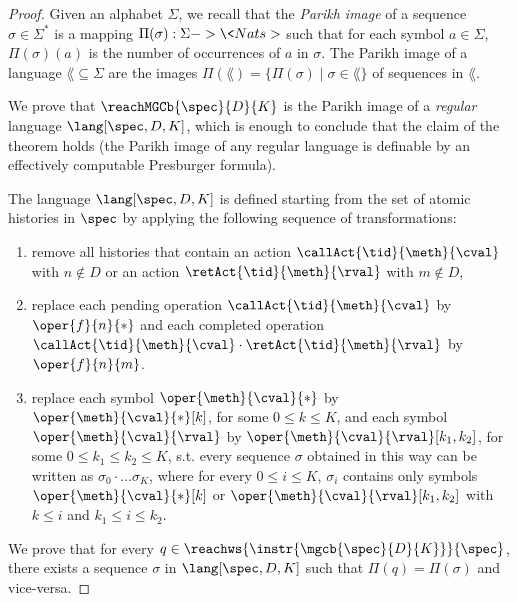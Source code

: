 \begin{proof}
Given an alphabet $\Sigma$, we recall that the \emph{Parikh image} of a sequence $\sigma\in\Sigma^*$ is a mapping 
$\Pi(\sigma):\Sigma->\<Nats>$ such that for each symbol $a\in\Sigma$, $\Pi(\sigma)(a)$ is the number of occurrences of $a$ in $\sigma$.
The Parikh image of a language $\lang\subseteq\Sigma$ are the images $\Pi(\lang)=\{\Pi(\sigma)\mid \sigma\in \lang\}$
of sequences in $\lang$. 

We prove that $\reachMGCb{\spec}{D}{K}$ is the Parikh image of a \emph{regular} language $\lang[\spec,D,K]$, which is enough to
conclude that the claim of the theorem holds (the Parikh image of any regular language is definable by an effectively computable Presburger formula). 

The language $\lang[\spec,D,K]$ is defined starting from the set of atomic histories in $\spec$ by applying the following sequence of transformations: %
\begin{enumerate}
	\item remove all histories that contain an action $\callAct{\tid}{\meth}{\cval}$ with $n\not\in D$ or an action $\retAct{\tid}{\meth}{\rval}$ with 
$m\not\in D$,
	\item replace each pending operation $\callAct{\tid}{\meth}{\cval}$ by $\oper{f}{n}{*}$ and each completed
operation $\callAct{\tid}{\meth}{\cval}\cdot \retAct{\tid}{\meth}{\rval}$ by $\oper{f}{n}{m}$.
	\item replace each symbol $\oper{\meth}{\cval}{*}$ by $\oper{\meth}{\cval}{*}[k]$, for some $0\leq k\leq K$, and each symbol 
$\oper{\meth}{\cval}{\rval}$ by $\oper{\meth}{\cval}{\rval}[k_1,k_2]$, for some $0\leq k_1\leq k_2\leq K$, s.t. every sequence $\sigma$ obtained in this way can be written as $\sigma_0\cdot\ldots\sigma_K$,
where for every $0\leq i\leq K$, $\sigma_i$ contains only symbols $\oper{\meth}{\cval}{*}[k]$ or $\oper{\meth}{\cval}{\rval}[k_1,k_2]$ with $k\leq i$ and $k_1\leq i\leq k_2$. 
\end{enumerate}

We prove that for every $q\in \reachws{\instr{\mgcb{\spec}{D}{K}}}{\spec}$, there exists a sequence $\sigma$ in $\lang[\spec,D,K]$ such that $\Pi(q)=\Pi(\sigma)$ 
and vice-versa.


\end{proof}
